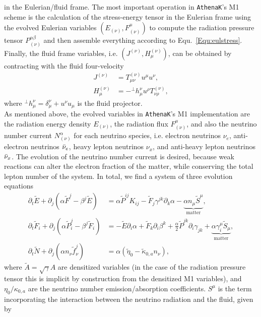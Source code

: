 \documentclass{article}
\begin{document}
in the Eulerian/fluid frame. The most important operation in \texttt{AthenaK}'s M1 scheme is the calculation of the stress-energy tensor in
the Eulerian frame using the evolved Eulerian variables $(E_{(\nu)},F_{(\nu)}^{\mu})$ to compute the radiation pressure tensor $P_{(\nu)}^{\alpha\beta}$ and then assemble everything
according to Equ.~\eqref{Equ:eulstress}. Finally, the fluid frame variables, i.e. $(J^{(\nu)},H^{(\nu)}_{\mu})$, can be obtained by contracting with the fluid
four-velocity
\begin{align}
  J^{(\nu)}&=T^{(\nu)}_{\mu\nu}u^{\mu}u^{\nu},\\
  H_{\mu}^{(\nu)}&=-^{\perp}h_{\mu}^{\nu}u^{\rho}T^{(\nu)}_{\nu\rho},
\end{align}
where $^{\perp}h_{\mu}^{\nu}=\delta^{\nu}_{\mu}+u^{\nu}u_{\mu}$ is the fluid projector.\\
As mentioned above, the evolved variables in \texttt{AthenaK}'s M1 implementation are the radiation energy density $E_{(\nu)}$, the radiation flux
$F_{(\nu)}^{\mu}$, and also the neutrino number current $N_{(\nu)}^{\alpha}$ for each neutrino species, i.e. electron neutrinos $\nu_e$, anti-electron neutrinos $\Bar{\nu}_e$,
heavy lepton neutrinos $\nu_x$, and anti-heavy lepton neutrinos $\Bar{\nu}_x$. The evolution of the neutrino number current is desired, because weak reactions can alter the electron fraction
of the matter, while conserving the total lepton number of the system. In total, we find a system of three evolution equations
\begin{align}
  \partial_t\tilde{E}+\partial_j(\alpha\tilde{F}^j-\beta^j\tilde{E})&=\alpha \tilde{P}^{ij}K_{ij}-\tilde{F}_j\gamma^{jk}\partial_k\alpha-\underbrace{\alpha n_{\mu}\tilde{S}^{\mu}}_{\text{matter}},\label{Equ:Eevo}\\
  \partial_t\tilde{F}_i+\partial_j(\alpha \tilde{P}^j_i-\beta^j\tilde{F}_i)&=-\tilde{E}\partial_i\alpha+\tilde{F}_k\partial_i\beta^k+\frac{\alpha}{2}\tilde{P}^{jk}\partial_i\gamma_{jk}+\underbrace{\alpha \gamma^{\mu}_i\tilde{S}_{\mu}}_{\text{matter}},\label{Equ:Fevo}\\
  \partial_t \tilde{N}+\partial_j(\alpha n_{\nu}\tilde{f}^j_{\nu})&=\alpha(\tilde{\eta}_0-\tilde{\kappa}_{0,a}n_{\nu}),\label{Equ:evoN}
\end{align}
where $\tilde{A}=\sqrt{\gamma}A$ are densitized variables (in the case of the radiation pressure tensor this is implicit by construction from the
densitized M1 variables), and $\eta_0/\kappa_{0,a}$ are the neutrino number emission/absorption coefficients. $S^{\mu}$ is the term incorporating the interaction between the neutrino radiation and the fluid, given by
\end{document}
